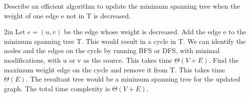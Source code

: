 \begin{prob}
\begin{subprobset}
	    \begin{subprob}
    		Describe an efficient algorithm to update the minimum spanning tree when the weight of one edge e not in T is decreased.
    		\begin{responsebox}{2in}
    		    Let $e = (u,v)$ be the edge whose weight is decreased. Add the edge e to the minimum spanning tree T. This would result in a cycle in T.
    		    We can identify the nodes and the edges on the cycle by running BFS or DFS, with minimal modifications, with u or v as the source. This takes time $\Theta(V + E)$.
    	            Find the maximum weight edge on the cycle and remove it from T. This takes time $\Theta(E)$.
    		    The resultant tree would be a minimum spanning tree for the updated graph. The total time complexity is $\Theta(V + E)$.
    		\end{responsebox}
        \end{subprob}
    \end{subprobset}
\end{prob}